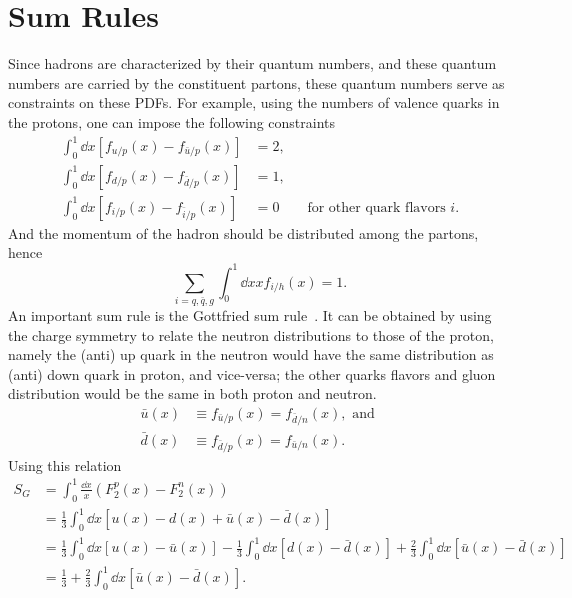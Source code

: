 \documentclass[../main.tex]{subfiles}
\begin{document}
\section{Sum Rules}
\label{sec:sum_rules}
Since hadrons are characterized by their quantum numbers, and these quantum numbers
are carried by the constituent partons, these quantum numbers serve as constraints
on these PDFs. For example, using the numbers of valence quarks in the protons,
one can impose the following constraints
\begin{equation}
	\begin{split}
		\int_{0}^{1} \dd{x} \left[f_{u/p} \left(x\right)-f_{\bar{u}/p} \left(x\right)\right]&=2,\\
		\int_{0}^{1} \dd{x} \left[f_{d/p} \left(x\right)-f_{\bar{d}/p} \left(x\right)\right]&=1,\\
		\int_{0}^{1} \dd{x} \left[f_{i/p} \left(x\right)-f_{\bar{i}/p} \left(x\right)\right]&=0 \qquad \text{for other quark flavors } i.
	\end{split}
\end{equation}
And the momentum of the hadron should be distributed among the partons, hence
\begin{equation}
	\sum_{i=q,\bar{q},g}\int_{0}^{1} \dd{x} xf_{i/h}\left(x\right)=1.
\end{equation}
An important sum rule is the Gottfried sum rule~\cite{gottfried1967}. It can be obtained
by using the charge symmetry to relate the neutron distributions to those of
the proton, namely the (anti) up quark in the neutron would have the same distribution
as (anti) down quark in proton, and vice-versa; the other quarks flavors and gluon
distribution would be the same in both proton and neutron.
\begin{equation}
	\begin{split}
		\bar{u}(x) &\equiv f_{\bar{u}/p}(x) = f_{\bar{d}/n}(x),\text{ and }\\
		\bar{d}(x) &\equiv f_{\bar{d}/p}(x) = f_{\bar{u}/n}(x).
	\end{split}
\end{equation}
Using this relation
\begin{equation}
	\begin{split}
		S_G & = \int_0^1 \frac{\dd{x}}{x}\left(F_2^{p}(x) - F_{2}^{n}(x)\right)\\
		& = \frac{1}{3} \int_0^1 \dd{x} \left[u\left(x\right) - d\left(x\right)
			+ \bar{u}\left(x\right) - \bar{d}\left(x\right)\right]\\
		& = \frac{1}{3} \int_0^1 \dd{x} \left[u\left(x\right) - \bar{u}\left(x\right)\right]
		- \frac{1}{3} \int_0^1 \dd{x} \left[d\left(x\right) - \bar{d}\left(x\right)\right]
		+ \frac{2}{3} \int_0^1 \dd{x} \left[\bar{u}\left(x\right)-\bar{d}\left(x\right)\right]\\
		& = \frac{1}{3} + \frac{2}{3} \int_0^1 \dd{x} \left[\bar{u}\left(x\right)-\bar{d}\left(x\right)\right].
	\end{split}
\end{equation}
\end{document}
